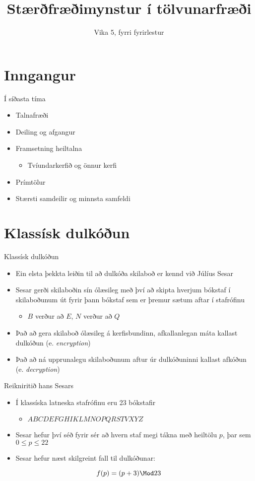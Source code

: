 \documentclass[handout]{beamer}
\title{Stærðfræðimynstur í tölvunarfræði}
\subtitle{Vika 5, fyrri fyrirlestur}
\begin{document}
\begin{frame}
\titlepage
\end{frame}


\section{Inngangur}

\begin{frame}{Í síðasta tíma}
\begin{itemize}
 \item Talnafræði
 \item Deiling og afgangur
 \item Framsetning heiltalna
 \begin{itemize}
  \item Tvíundarkerfið og önnur kerfi
 \end{itemize}
 \item Prímtölur
 \item Stærsti samdeilir og minnsta samfeldi
\end{itemize}
\end{frame}

\section{Klassísk dulkóðun}

\begin{frame}{Klassísk dulkóðun}
\begin{itemize}
 \item Ein elsta þekkta leiðin til að dulkóða skilaboð er kennd við Júlíus Sesar
 \item Sesar gerði skilaboðin sín ólæsileg með því að skipta hverjum bókstaf í skilaboðunum út fyrir þann bókstaf sem er þremur sætum aftar í stafrófinu
 \begin{itemize}
  \item $B$ verður að $E$, $N$ verður að $Q$
 \end{itemize}
 \item Það að gera skilaboð ólæsileg á kerfisbundinn, afkallanlegan máta kallast dulkóðun (e. \emph{encryption})
 \item Það að ná upprunalegu skilaboðunum aftur úr dulkóðuninni kallast afkóðun (e. \emph{decryption})
\end{itemize}
\end{frame}

\begin{frame}{Reikniritið hans Sesars}
\begin{itemize}
 \item Í klassíska latneska stafrófinu eru 23 bókstafir
 \begin{itemize}
  \item $A	B	C	D	E	F	G	H	 I	K	L	M	N	O	P	Q	R	S	T	V	X	Y	Z$
 \end{itemize}
 \item Sesar hefur því séð fyrir sér að hvern staf megi tákna með heiltölu $p$, þar sem $0 \leq p \leq 22$
 \item Sesar hefur næst skilgreint fall til dulkóðunar:
\end{itemize}
\[
 f(p) = (p + 3) \Mod 23
\]
\end{frame}
\end{document}
